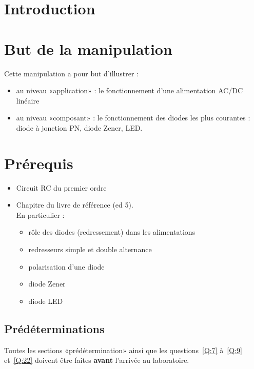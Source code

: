 \documentclass{../template/labo}
\author{The Fantastic Four}
\begin{document}

\section{Introduction}

\section{But de la manipulation}
Cette manipulation a pour but d'illustrer :
\begin{itemize}
\item au niveau «application» : le fonctionnement d'une alimentation AC/DC linéaire
\item au niveau «composant» : le fonctionnement des diodes les plus courantes : diode à jonction PN, diode Zener, LED.
\end{itemize}

\section{Prérequis}
\begin{itemize}
\item Circuit RC du premier ordre
\item Chapitre  du livre de référence (ed 5).\\ En particulier :
\begin{itemize}
\item rôle des diodes (redressement) dans les alimentations
\item redresseurs simple et double alternance
\item polarisation d'une diode
\item diode Zener
\item diode LED
\end{itemize}



\end{itemize}

\subsection{Prédéterminations}
Toutes les sections «prédétermination» ainsi que les questions~\ref{Q:7} à~\ref{Q:9} et~\ref{Q:22} doivent être faites \textbf{avant} l'arrivée au laboratoire.
\end{document}
